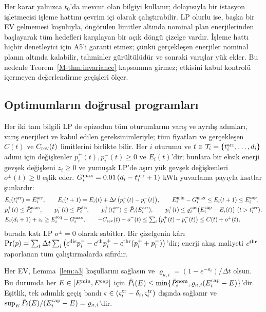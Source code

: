 Her karar yalnızca $t_0$'da mevcut olan bilgiyi kullanır; dolayısıyla bir istasyon işletmecisi işleme hattını çevrim içi olarak çalıştırabilir.
LP olurlu ise, başka bir EV gelmemesi koşuluyla, öngörülen limitler altında nominal plan enerjilerinden başlayarak tüm hedefleri karşılayan bir açık döngü çizelge vardır.
İşleme hattı hiçbir denetleyici için A5'i garanti etmez; çünkü gerçekleşen enerjiler nominal planın altında kalabilir, tahminler gürültülüdür ve sonraki varışlar yük ekler.
Bu nedenle Teorem~\ref{M-thm:invariance} kapsamına girmez; etkisini kabul kontrolü içermeyen değerlendirme geçişleri ölçer.

\subsection{Optimumların doğrusal programları}\label{app:oracle}

Her iki tam bilgili LP de epizodun tüm oturumlarını varış ve ayrılış adımları, varış enerjileri ve kabul edilen gereksinimleriyle; tüm fiyatları ve gerçekleşen $C(t)$ ve $C_{\mathrm{rev}}(t)$ limitlerini birlikte bilir.
Her $i$ oturumu ve $t\in\mathcal T_i=\{t_i^{\mathrm{arr}},\dots,d_i\}$ adımı için değişkenler $p_i^{+}(t),p_i^{-}(t)\ge0$ ve $E_i(t)$'dir; bunlara bir eksik enerji gevşek değişkeni $z_i\ge0$ ve yumuşak LP'de aşırı yük gevşek değişkenleri $o^{\pm}(t)\ge0$ eşlik eder.
$G_i^{\max}=0.01\,(d_i-t_i^{\mathrm{arr}}+1)$ kWh yuvarlama payıyla kısıtlar şunlardır:
\begin{equation}\label{eq:lp}
\begin{aligned}
&E_i(t_i^{\sm{arr}})=E_i^{\sm{arr}},\qquad E_i(t+1)=E_i(t)+\Delta t\,\big(p_i^{+}(t)-p_i^{-}(t)\big),\qquad E_i^{\min}-G_i^{\max}\le E_i(t+1)\le E_i^{\sm{cap}},\\
&p_i^{+}(t)\le\Pnom_i,\qquad p_i^{-}(t)\le\Pdis_i,\qquad p_i^{+}(t_i^{\sm{arr}})\le\bar P_i(E_i^{\sm{arr}}),\qquad p_i^{+}(t)\le\varrho_i^{\sm{out}}\big(E_i^{\sm{cap}}-E_i(t)\big)\ (t>t_i^{\sm{arr}}),\\
&E_i(d_i+1)+z_i\ge\Ereq_i-G_i^{\max},\qquad -\Crev(t)-o^{-}(t)\le\textstyle\sum_{i}\big(p_i^{+}(t)-p_i^{-}(t)\big)\le C(t)+o^{+}(t),
\end{aligned}
\end{equation}
burada katı LP $o^{\pm}=0$ olarak sabitler.
Bir çizelgenin kârı $\mathrm{Pr}(p)=\sum_t\Delta t\sum_i\big(c^{\mathrm{dis}}p_i^{-}-c^{\mathrm{ch}}p_i^{+}-c^{\mathrm{thr}}(p_i^{+}+p_i^{-})\big)$'dir; enerji akışı maliyeti $c^{\mathrm{thr}}$ raporlanan tüm çalıştırmalarda sıfırdır.

\begin{lemma}\label{lem:taperrows}
Her EV, Lemma~\ref{lem:a3} koşullarını sağlasın ve $\varrho_{\kappa,i}=(1-e^{-\kappa_i})/\Delta t$ olsun.
Bu durumda her $E\in[E^{\min},E^{\mathrm{cap}}]$ için $\bar P_i(E)\le\min\{\bar P^{\mathrm{nom}}_i,\varrho_{\kappa,i}(E_i^{\mathrm{cap}}-E)\}$'dir.
Eşitlik, tek adımlık geçiş bandı $\varsigma\in(\varsigma_i^{\mathrm{tr}}-\delta_i,\varsigma_i^{\mathrm{tr}})$ dışında sağlanır ve $\sup_E\bar P_i(E)/(E_i^{\mathrm{cap}}-E)=\varrho_{\kappa,i}$'dir.
\end{lemma}

